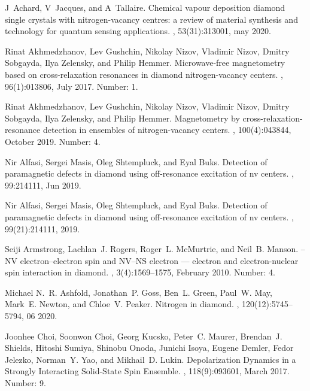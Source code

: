 \documentclass[9pt,twocolumn,twoside]{revtex4-1}
\begin{document}
\begin{thebibliography}{10}

J~Achard, V~Jacques, and A~Tallaire.
\newblock Chemical vapour deposition diamond single crystals with
  nitrogen-vacancy centres: a review of material synthesis and technology for
  quantum sensing applications.
, 53(31):313001, may 2020.

Rinat Akhmedzhanov, Lev Gushchin, Nikolay Nizov, Vladimir Nizov, Dmitry
  Sobgayda, Ilya Zelensky, and Philip Hemmer.
\newblock Microwave-free magnetometry based on cross-relaxation resonances in
  diamond nitrogen-vacancy centers.
, 96(1):013806, July 2017.
\newblock Number: 1.

Rinat Akhmedzhanov, Lev Gushchin, Nikolay Nizov, Vladimir Nizov, Dmitry
  Sobgayda, Ilya Zelensky, and Philip Hemmer.
\newblock Magnetometry by cross-relaxation-resonance detection in ensembles of
  nitrogen-vacancy centers.
, 100(4):043844, October 2019.
\newblock Number: 4.

Nir Alfasi, Sergei Masis, Oleg Shtempluck, and Eyal Buks.
\newblock Detection of paramagnetic defects in diamond using off-resonance
  excitation of nv centers.
, 99:214111, Jun 2019.

Nir Alfasi, Sergei Masis, Oleg Shtempluck, and Eyal Buks.
\newblock Detection of paramagnetic defects in diamond using off-resonance
  excitation of nv centers.
, 99(21):214111, 2019.

Seiji Armstrong, Lachlan~J. Rogers, Roger~L. McMurtrie, and Neil~B. Manson.
–{NV} electron–electron spin and {NV}–{NS} electron —
  electron and electron-nuclear spin interaction in diamond.
, 3(4):1569--1575, February 2010.
\newblock Number: 4.

Michael N.~R. Ashfold, Jonathan~P. Goss, Ben~L. Green, Paul~W. May, Mark~E.
  Newton, and Chloe~V. Peaker.
\newblock Nitrogen in diamond.
, 120(12):5745--5794, 06 2020.

Joonhee Choi, Soonwon Choi, Georg Kucsko, Peter~C. Maurer, Brendan~J. Shields,
  Hitoshi Sumiya, Shinobu Onoda, Junichi Isoya, Eugene Demler, Fedor Jelezko,
  Norman~Y. Yao, and Mikhail~D. Lukin.
\newblock Depolarization {Dynamics} in a {Strongly} {Interacting}
  {Solid}-{State} {Spin} {Ensemble}.
, 118(9):093601, March 2017.
\newblock Number: 9.


\end{thebibliography}
\end{document}
